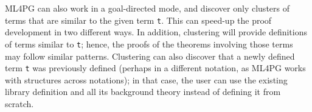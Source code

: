 ML4PG can also work in a goal-directed mode, 
and discover only clusters of terms that are similar to the given term \lstinline?t?.
This can speed-up the proof development in two different ways. 
In addition, clustering will provide definitions of terms similar to \lstinline?t?; %
hence, the proofs of the theorems 
involving those terms may follow similar patterns.
Clustering can also discover that a newly defined term \lstinline?t? was previously defined (perhaps in a different notation, as ML4PG works with structures across notations);
in that case, the user can use the existing library definition and all its background theory instead of defining it from scratch. 





 





